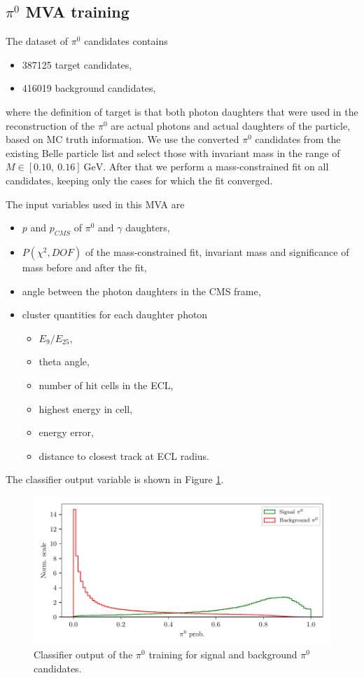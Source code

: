 \documentclass[oneside,a4paper,openany,12pt]{scrbook}
\newcommand {\e}[1]{\mathrm{~#1}}
\begin{document}
\subsection{$\pi^0$ MVA training}

The dataset of $\pi^0$ candidates contains
\begin{itemize}
\item 387125 target candidates,
\item 416019 background candidates,
\end{itemize}
where the definition of target is that both photon daughters that were used in the reconstruction of the $\pi^0$ are actual photons and actual daughters of the particle, based on MC truth information. We use the converted $\pi^0$ candidates from the existing Belle particle list and select those with invariant mass in the range of $M \in [0.10,~0.16]\e{GeV}$. After that we perform a mass-constrained fit on all candidates, keeping only the cases for which the fit converged. 

The input variables used in this MVA are
\begin{itemize}
\item $p$ and $p_{CMS}$ of $\pi^0$ and $\gamma$ daughters,
\item $P(\chi^2,DOF)$ of the mass-constrained fit, invariant mass and significance of mass before and after the fit,
\item angle between the photon daughters in the CMS frame,
\item cluster quantities for each daughter photon
	\begin{itemize}
	\item $E_9/E_{25}$,
	\item theta angle,
	\item number of hit cells in the ECL,
	\item highest energy in cell,
	\item energy error,
	\item distance to closest track at ECL radius.
	\end{itemize}
\end{itemize}

The classifier output variable is shown in Figure \ref{fig:ROE_pi0}.

\begin{figure}[H]
\centering
\captionsetup{width=0.8\linewidth}
\includegraphics[width=\linewidth]{fig/ROECleanup_pi0}
\caption{Classifier output of the $\pi^0$ training for signal and background $\pi^0$ candidates.}
\label{fig:ROE_pi0}
\end{figure}
\end{document}
